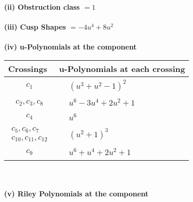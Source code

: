 \documentclass[1p]{elsarticle_modified}
\theoremstyle{definition}
\begin{document}
\flushleft \textbf{(ii) Obstruction class $= 1$}\\~\\
\flushleft \textbf{(iii) Cusp Shapes $= -4 u^4+8 u^2$}\\~\\
\newpage\renewcommand{\arraystretch}{1}
\flushleft \textbf{(iv) u-Polynomials at the component}\newline \\
\begin{tabular}{m{50pt}|m{274pt}}
Crossings & \hspace{64pt}u-Polynomials at each crossing \\
\hline $$\begin{aligned}c_{1}\end{aligned}$$&$\begin{aligned}
&(u^3+u^2-1)^2
\end{aligned}$\\
\hline $$\begin{aligned}c_{2},c_{3},c_{8}\end{aligned}$$&$\begin{aligned}
&u^6-3 u^4+2 u^2+1
\end{aligned}$\\
\hline $$\begin{aligned}c_{4}\end{aligned}$$&$\begin{aligned}
&u^6
\end{aligned}$\\
\hline $$\begin{aligned}c_{5},c_{6},c_{7}\\c_{10},c_{11},c_{12}\end{aligned}$$&$\begin{aligned}
&(u^2+1)^3
\end{aligned}$\\
\hline $$\begin{aligned}c_{9}\end{aligned}$$&$\begin{aligned}
&u^6+u^4+2 u^2+1
\end{aligned}$\\
\hline
\end{tabular}\\~\\
\newpage\renewcommand{\arraystretch}{1}
\flushleft \textbf{(v) Riley Polynomials at the component}\newline \\
\end{document}
